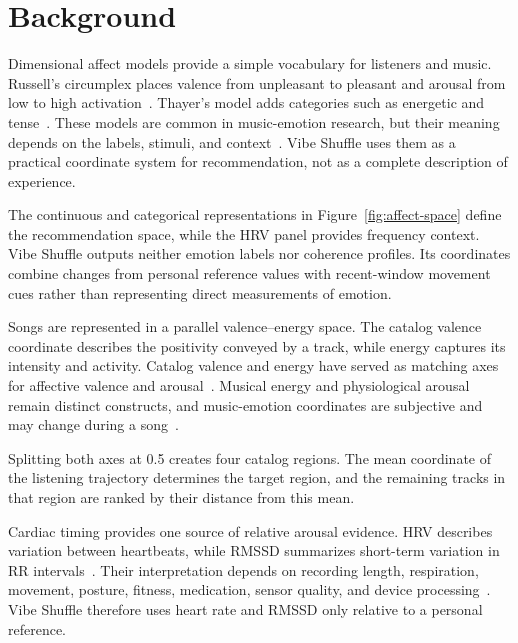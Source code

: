 \section{Background}

Dimensional affect models provide a simple vocabulary for listeners and music.
Russell's circumplex places valence from unpleasant to pleasant and arousal
from low to high activation~\cite{posner2005,russell1980}. Thayer's model adds
categories such as energetic and tense~\cite{thayer1990}. These models are
common in music-emotion research, but their meaning depends on the labels,
stimuli, and context~\cite{eerola2013}. Vibe Shuffle uses them as a practical
coordinate system for recommendation, not as a complete description of
experience.

The continuous and categorical representations in
Figure~\ref{fig:affect-space} define the recommendation space, while the HRV
panel provides frequency context. Vibe Shuffle outputs neither emotion labels
nor coherence profiles. Its coordinates combine changes from personal reference
values with recent-window movement cues rather than representing direct
measurements of emotion.

Songs are represented in a parallel valence--energy space. The catalog valence
coordinate describes
the positivity conveyed by a track, while energy captures its intensity and
activity. Catalog valence and energy have served as matching axes for affective
valence and arousal~\cite{helmholz2019}. Musical energy and physiological
arousal remain distinct constructs, and music-emotion coordinates are
subjective and may change during a song~\cite{aljanaki2017,yang2012}.

Splitting both axes at 0.5 creates four catalog regions. The mean coordinate of
the listening trajectory determines the target region, and the remaining tracks
in that region are ranked by their distance from this mean.

Cardiac timing provides one source of relative arousal evidence. HRV describes
variation between heartbeats, while RMSSD summarizes short-term variation in RR
intervals~\cite{shaffer2017}. Their interpretation depends on recording length,
respiration, movement, posture, fitness, medication, sensor quality, and device
processing~\cite{laborde2017,quigley2024}. Vibe Shuffle therefore uses heart
rate and RMSSD only relative to a personal reference.
